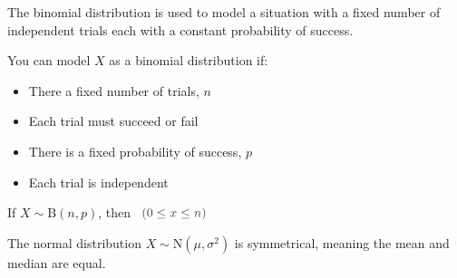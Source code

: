 \documentclass[../main.tex]{subfile}
\begin{document}


The binomial distribution is used to model a situation with a fixed number of independent trials each with a constant probability of success.

You can model $X$ as a binomial distribution if:
\begin{itemize}
	\item There a fixed number of trials, $n$
	\item Each trial must succeed or fail
	\item There is a fixed probability of success, $p$
	\item Each trial is independent
\end{itemize}

\begin{center}
	If $X \sim \text{B}(n, p)$, then 
	\ $\constraint{0 \leq x \leq n}$
\end{center}


The normal distribution $X \sim \text{N}(\mu, \sigma^2)$ is symmetrical, meaning the mean and median are equal.

\begin{figure}[h]
\begin{center}
\end{center}
\end{figure}
\end{document}
